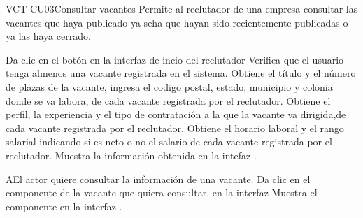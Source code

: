 \clearpage
\begin{UseCase}[]{VCT-CU03}{Consultar vacantes}{
	Permite al reclutador de una empresa  consultar las vacantes que haya publicado ya seha que hayan sido recientemente publicadas 
	o ya las haya cerrado.
	}
\end{UseCase}

\begin{UCtrayectoria}
	\UCpaso [\UCactor] Da clic en el botón  en la interfaz de incio del reclutador
	\UCpaso [\UCsist] Verifica que el usuario tenga almenos una vacante registrada en el sistema.%
	\UCpaso [\UCsist] Obtiene el título y el número de plazas de la vacante, ingresa el codigo postal, estado, municipio y colonia donde 
	se va labora, de cada vacante registrada por el reclutador.
	\UCpaso [\UCsist] Obtiene el perfil, la experiencia y el tipo de contratación a la que la vacante va dirigida,de cada vacante registrada por el reclutador.
	\UCpaso [\UCsist] Obtiene el horario laboral y el rango salarial indicando si es neto o no el salario de cada vacante registrada por el reclutador.
	\UCpaso [\UCsist] Muestra la información obtenida en la intefaz . 
\end{UCtrayectoria}


\begin{UCtrayectoriaA}{A}{El actor quiere consultar la información de una vacante.}
	\UCpaso [\UCactor] Da clic en el componente  de la vacante que quiera consultar, en la interfaz  
	\UCpaso [\UCsist] Muestra el componente  en la interfaz .
\end{UCtrayectoriaA} 